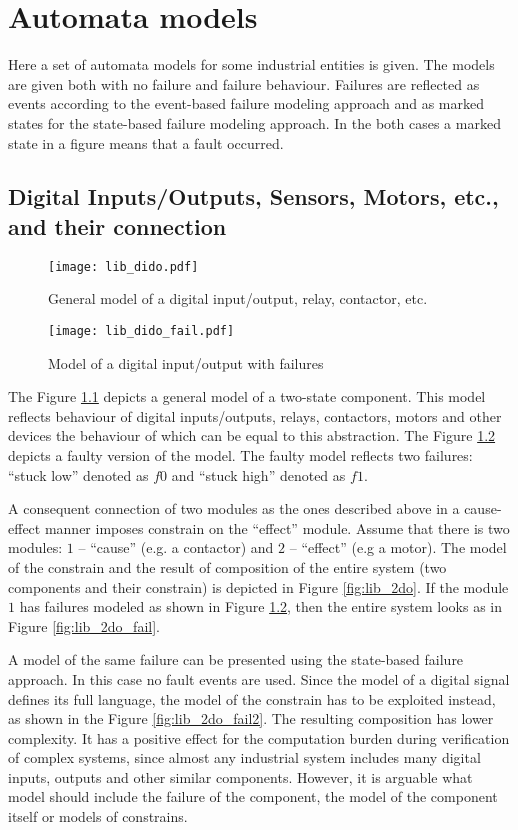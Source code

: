 \chapter{Automata models}
\label{chap:automata_models}

Here a set of automata models for some industrial entities is given. The
models are given both with no failure and failure behaviour. Failures are
reflected as events according to the event-based failure modeling approach and
as marked states for the state-based failure modeling approach. In the both
cases a marked state in a figure means that a fault occurred.  

\section{Digital Inputs/Outputs, Sensors, Motors, etc., and their connection}

\begin{figure}[th]
	\centering
	\texttt{[image: lib\_dido.pdf]}
	\caption{General model of a digital input/output, relay, contactor, etc.}
	\label{fig:lib_dido}
\end{figure}


\begin{figure}[th]
	\centering
	\texttt{[image: lib\_dido\_fail.pdf]}
	\caption{Model of a digital input/output with failures}
	\label{fig:lib_dido_fail}
\end{figure}

The Figure \ref{fig:lib_dido} depicts a general model of a two-state component.
This model reflects behaviour of digital inputs/outputs, relays, contactors,
motors and other devices the behaviour of which can be equal to this
abstraction. The Figure \ref{fig:lib_dido_fail} depicts a faulty version of the
model. The faulty model reflects two failures: ``stuck low'' denoted as $f0$ and
``stuck high'' denoted as $f1$.

A consequent connection of two modules as the ones described above in a
cause-effect manner imposes constrain on the ``effect'' module. Assume that
there is two modules: $1$ -- ``cause'' (e.g. a contactor) and $2$ -- ``effect''
(e.g a motor). The model of the constrain and the result of composition of the
entire system (two components and their constrain) is depicted in Figure
\ref{fig:lib_2do}. If the module $1$ has failures modeled as shown in Figure
\ref{fig:lib_dido_fail}, then the entire system looks as in Figure
\ref{fig:lib_2do_fail}.

A model of the same failure can be presented using the state-based
failure approach. In this case no fault events are used. Since the model of
a digital signal defines its full language, the model of the constrain has to be
exploited instead, as shown in the Figure \ref{fig:lib_2do_fail2}. The resulting
composition has lower complexity. It has a positive effect for the
computation burden during verification of complex systems, since almost any
industrial system includes many digital inputs, outputs and other similar
components. However, it is arguable what model should include the failure of the
component, the model of the component itself or models of constrains.


